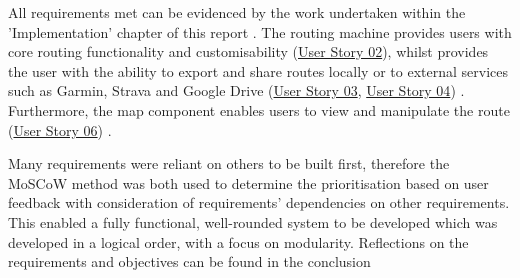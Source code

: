 All requirements met can be evidenced by the work undertaken within the 'Implementation' chapter of this report . The routing machine provides users with core routing functionality and customisability (\hyperref[tab:user-story-02]{User Story 02}), whilst provides the user with the ability to export and share routes locally or to external services such as Garmin, Strava and Google Drive (\hyperref[tab:user-story-03]{User Story 03}, \hyperref[tab:user-story-04]{User Story 04}) . Furthermore, the map component enables users to view and manipulate the route (\hyperref[tab:user-story-06]{User Story 06}) .

Many requirements were reliant on others to be built first, therefore the MoSCoW method was both used to determine the prioritisation based on user feedback with consideration of requirements' dependencies on other requirements. This enabled a fully functional, well-rounded system to be developed which was developed in a logical order, with a focus on modularity. Reflections on the requirements and objectives can be found in the conclusion 


